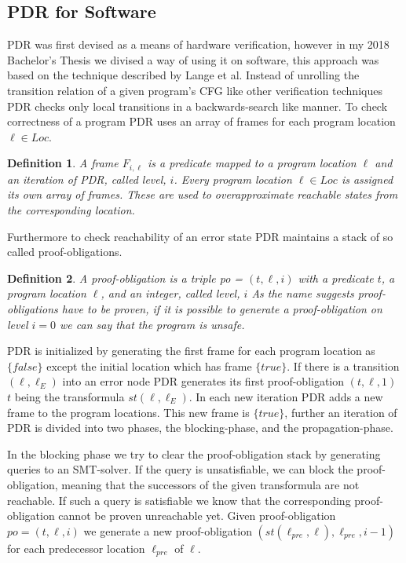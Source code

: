 \documentclass{article}
\newtheorem{mydef}{Definition}
\begin{document}
	\subsection{PDR for Software}
	PDR was first devised as a means of hardware verification, however in my 2018 Bachelor's Thesis we divised a way of using it on software, this approach was based on the technique described by Lange et al. \cite{DBLP:conf/fmcad/0001NN15}
	Instead of unrolling the transition relation of a given program's CFG like other verification techniques PDR checks only local transitions in a backwards-search like manner.
	\smallskip
	To check correctness of a program PDR uses an array of frames for each program location $\ell \in Loc$. 
	\begin{mydef}
		A frame $F_{i,\ell}$ is a predicate mapped to a program location $\ell$ and an iteration of PDR, called level, $i$.
		Every program location $\ell \in Loc$ is assigned its own array of frames. These are used to overapproximate reachable states from the corresponding location.
	\end{mydef}
	Furthermore to check reachability of an error state PDR maintains a stack of so called proof-obligations.
	\begin{mydef}
		A proof-obligation is a triple po = $(t, \ell, i)$ with a predicate $t$, a program location $\ell$, and an integer, called level, $i$
		As the name suggests proof-obligations have to be proven, if it is possible to generate a proof-obligation on level $i = 0$ we can say that the program is unsafe.
	\end{mydef}
	PDR is initialized by generating the first frame for each program location as $\{ false \}$ except the initial location which has frame $\{ true \}$. If there is a transition $(\ell, \ell_E)$ into an error node PDR generates its first proof-obligation $(t, \ell, 1)$ $t$ being the transformula $st(\ell, \ell_E)$.
	In each new iteration PDR adds a new frame to the program locations. This new frame is $\{true\}$, further
	an iteration of PDR is divided into two phases, the blocking-phase, and the propagation-phase.
	
	\bigskip
	
	In the blocking phase we try to clear the proof-obligation stack by generating queries to an SMT-solver.
	If the query is unsatisfiable, we can block the proof-obligation, meaning that the successors of the given transformula are not reachable.
	If such a query is satisfiable we know that the corresponding proof-obligation cannot be proven unreachable yet. Given proof-obligation  $po = (t, \ell, i)$ we generate a new proof-obligation $(st(\ell_{pre}, \ell), \ell_{pre}, i-1) $ for each predecessor location $\ell_{pre}$ of $\ell$.
	
\end{document}
